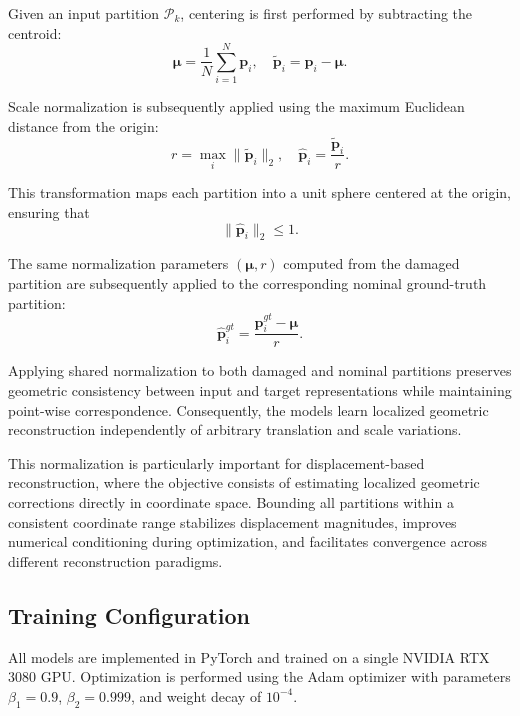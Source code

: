 Given an input partition $\mathcal{P}_{k}$, centering is first performed by subtracting the centroid:
\begin{equation}
\boldsymbol{\mu} = \frac{1}{N} \sum_{i=1}^{N} \mathbf{p}_i,
\quad
\tilde{\mathbf{p}}_i = \mathbf{p}_i - \boldsymbol{\mu}.
\end{equation}

Scale normalization is subsequently applied using the maximum Euclidean distance from the origin:
\begin{equation}
r = \max_i \|\tilde{\mathbf{p}}_i\|_2,
\quad
\hat{\mathbf{p}}_i = \frac{\tilde{\mathbf{p}}_i}{r}.
\end{equation}

This transformation maps each partition into a unit sphere centered at the origin, ensuring that
\begin{equation}
\|\hat{\mathbf{p}}_i\|_2 \leq 1.
\end{equation}

The same normalization parameters $(\boldsymbol{\mu}, r)$ computed from the damaged partition are subsequently applied to the corresponding nominal ground-truth partition:
\begin{equation}
\hat{\mathbf{p}}_i^{gt} =
\frac{\mathbf{p}_i^{gt} - \boldsymbol{\mu}}{r}.
\end{equation}

Applying shared normalization to both damaged and nominal partitions preserves geometric consistency between input and target representations while maintaining point-wise correspondence. Consequently, the models learn localized geometric reconstruction independently of arbitrary translation and scale variations.

This normalization is particularly important for displacement-based reconstruction, where the objective consists of estimating localized geometric corrections directly in coordinate space. Bounding all partitions within a consistent coordinate range stabilizes displacement magnitudes, improves numerical conditioning during optimization, and facilitates convergence across different reconstruction paradigms.

\subsection{Training Configuration}
\label{sec:training_configuration}

All models are implemented in PyTorch and trained on a single NVIDIA RTX 3080 GPU. Optimization is performed using the Adam optimizer with parameters $\beta_1 = 0.9$, $\beta_2 = 0.999$, and weight decay of $10^{-4}$.

